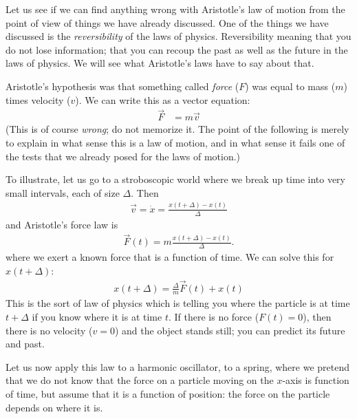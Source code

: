 \documentclass[pagesize,headsepline,10pt,parskip=half]{scrreprt}
\begin{document}
      Let us see if we can find anything wrong with Aristotle's law of motion
      from the point of view of things we have already discussed.  One of the
      things we have discussed is the \emph{reversibility} of the laws of
      physics. Reversibility meaning that you do not lose information; that you can
      recoup the past as well as the future in the laws of physics.  We will see
      what Aristotle's laws have to say about that.
      
      Aristotle's hypothesis was that something called \emph{force} ($F$) was
      equal to mass ($m$) times velocity ($v$). We can write this as a vector
      equation:
      \begin{align*}
        \vec F &= m \vec v
      \end{align*}
      (This is of course \emph{wrong}; do not memorize it. The point of the
      following is merely to explain in what sense this is a law of motion, and
      in what sense it fails one of the tests that we already posed for the laws
      of motion.)
      
      To illustrate, let us go to a stroboscopic world where we break up
      time into very small intervals, each of size $\Delta$.  Then
      \begin{align*}
        \vec v = \dot x = \frac{x(t + \Delta) - x(t)}{\Delta}
      \end{align*}
      and Aristotle's force law is
      \begin{align*}
        \vec F(t) = m \frac{x(t + \Delta) - x(t)}{\Delta}.
      \end{align*}
      where we exert a known force that is a function of time.  We can solve
      this for $x(t + \Delta)$:
      \begin{align}\label{eq:aristotle}
        x(t + \Delta) = \frac{\Delta}{m} \vec F(t) + x(t)
      \end{align}
      This is the sort of law of physics which is telling you where the particle
      is at time $t + \Delta$ if you know where it is at time $t$.  If there is
      no force ($F(t) = 0$), then there is no velocity ($v = 0$) and the object
      stands still; you can predict its future and past.
      
      Let us now apply this law to a harmonic oscillator, to a spring, where we
      pretend that we do not know that the force on a particle moving on the
      $x$-axis is function of time, but assume that it is a function of
      position:
      the force on the particle depends on where it is.
      
\end{document}

